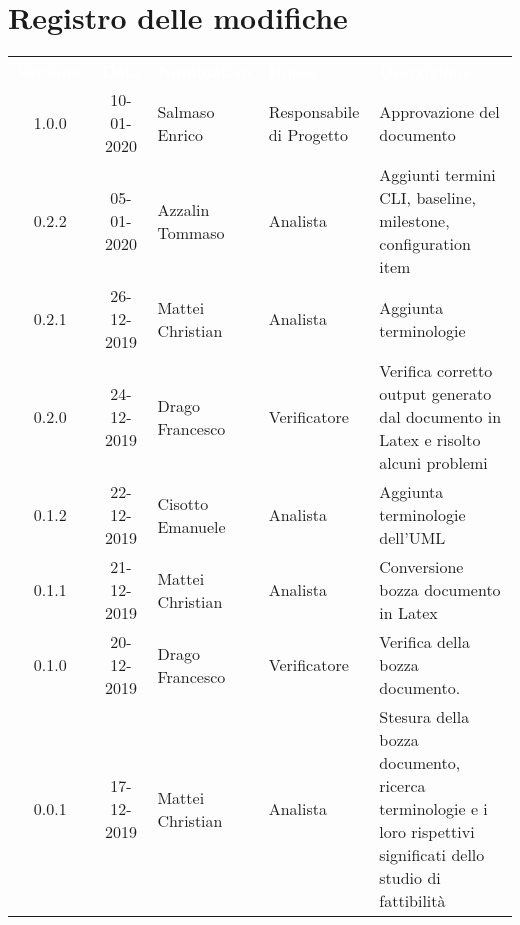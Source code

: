 \section*{Registro delle modifiche}
{
\renewcommand{\arraystretch}{1.5}
\centering
\begin{longtable}{ c c  C{4cm}  C{3cm} C{4cm}}
\textcolor{white}{\textbf{Versione}} & \textcolor{white}{\textbf{Data}} & \textcolor{white}{\textbf{Nominativo}} & \textcolor{white}{\textbf{Ruolo}} & \textcolor{white}{\textbf{Descrizione}}\\	


1.0.0 & 10-01-2020 & Salmaso Enrico & Responsabile di Progetto & Approvazione del documento \\



0.2.2 & 05-01-2020 & Azzalin Tommaso & Analista & Aggiunti termini CLI, baseline, milestone, configuration item \\

0.2.1 & 26-12-2019 & Mattei Christian & Analista & Aggiunta terminologie \\

0.2.0 & 24-12-2019 & Drago Francesco & Verificatore & Verifica corretto output generato dal documento in Latex e risolto alcuni problemi\\

0.1.2 & 22-12-2019 & Cisotto Emanuele & Analista & Aggiunta terminologie dell'UML \\

0.1.1 & 21-12-2019 & Mattei Christian & Analista & Conversione bozza documento in Latex\\
		
0.1.0 & 20-12-2019 & Drago Francesco & Verificatore & Verifica della bozza documento.  \\
		
0.0.1 & 17-12-2019 & Mattei Christian & Analista & Stesura della bozza documento, ricerca terminologie e i loro rispettivi significati dello studio di fattibilità \\
		
\end{longtable}
}